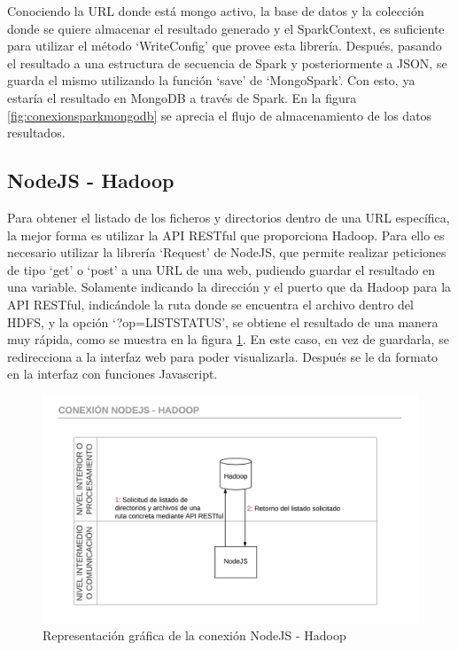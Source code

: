 Conociendo la URL donde está mongo activo, la base de datos y la colección donde se quiere almacenar el resultado generado y el SparkContext, es suficiente para utilizar el método ‘WriteConfig’ que provee esta librería. Después, pasando el resultado a una estructura de secuencia de Spark y posteriormente a JSON, se guarda el mismo utilizando la función ‘save’ de ‘MongoSpark’. Con esto, ya estaría el resultado en MongoDB a través de Spark. En la figura \ref{fig:conexionsparkmongodb} se aprecia el flujo de almacenamiento de los datos resultados.

\subsection{NodeJS - Hadoop}
Para obtener el listado de los ficheros y directorios dentro de una URL específica, la mejor forma es utilizar la API RESTful \cite{HadoopRestful} que proporciona Hadoop. Para ello es necesario utilizar la librería ‘Request’ de NodeJS, que permite realizar peticiones de tipo ‘get’ o ‘post’ a una URL de una web, pudiendo guardar el resultado en una variable. Solamente indicando la dirección y el puerto que da Hadoop para la API RESTful, indicándole la ruta donde se encuentra el archivo dentro del HDFS, y la opción ‘?op=LISTSTATUS’, se obtiene el resultado de una manera muy rápida, como se muestra en la figura \ref{fig:conexionnodejshadoop}. En este caso, en vez de guardarla, se redirecciona a la interfaz web para poder visualizarla. Después se le da formato en la interfaz con funciones Javascript.

\begin{figure}
	\centering
	\includegraphics[width=1\linewidth]{imagenes/Conexion_NodeJS_Hadoop}
	\caption{Representación gráfica de la conexión NodeJS - Hadoop}
	\label{fig:conexionnodejshadoop}
\end{figure}



